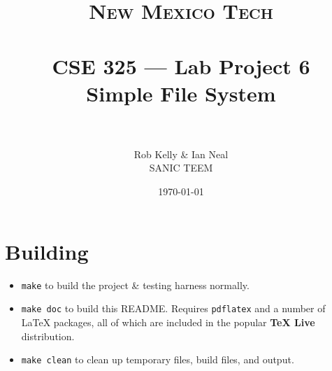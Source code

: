\documentclass[paper=a4, fontsize=11pt]{scrartcl}
\title{
  \normalfont \normalsize 
  \textsc{New Mexico Tech} \\ [25pt]
  \horrule{0.5pt} \\[0.4cm]
  \huge CSE 325 --- Lab Project 6 \\ Simple File System \\
  \horrule{2pt} \\[0.5cm]
}
\author{Rob Kelly \& Ian Neal \\ SANIC TEEM}
\date{\normalsize\today}
\begin{document}
\maketitle










\section*{Building}
\begin{itemize}
  \item \texttt{make} to build the project \& testing harness normally.

  \item \texttt{make doc} to build this README. Requires \texttt{pdflatex} and a number of \LaTeX\hspace{0em} packages, all of which are included in the popular \textbf{TeX Live} distribution.

  \item \texttt{make clean} to clean up temporary files, build files, and output.
\end{itemize} 
\end{document}
